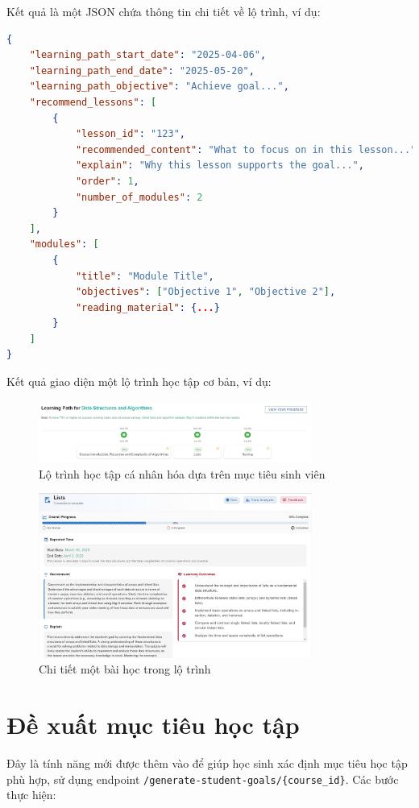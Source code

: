 Kết quả là một JSON chứa thông tin chi tiết về lộ trình, ví dụ:
\begin{lstlisting}[language=JSON]
{
    "learning_path_start_date": "2025-04-06",
    "learning_path_end_date": "2025-05-20",
    "learning_path_objective": "Achieve goal...",
    "recommend_lessons": [
        {
            "lesson_id": "123",
            "recommended_content": "What to focus on in this lesson...",
            "explain": "Why this lesson supports the goal...",
            "order": 1,
            "number_of_modules": 2
        }
    ],
    "modules": [
        {
            "title": "Module Title",
            "objectives": ["Objective 1", "Objective 2"],
            "reading_material": {...}
        }
    ]
}
\end{lstlisting}

Kết quả giao diện một lộ trình học tập cơ bản, ví dụ:
\begin{figure}[H]
    \centering
    \includegraphics[width=0.8\textwidth]{Images/UI_LLM/Learning_Path.png}
    \caption{Lộ trình học tập cá nhân hóa dựa trên mục tiêu sinh viên}
\end{figure}
\begin{figure}[H]
    \centering
    \includegraphics[width=0.8\textwidth]{Images/UI_LLM/Lesson_detail.png}
    \caption{Chi tiết một bài học trong lộ trình}
\end{figure}
\section{Đề xuất mục tiêu học tập}
Đây là tính năng mới được thêm vào để giúp học sinh xác định mục tiêu học tập phù hợp, sử dụng endpoint \texttt{/generate-student-goals/\{course\_id\}}. Các bước thực hiện:

